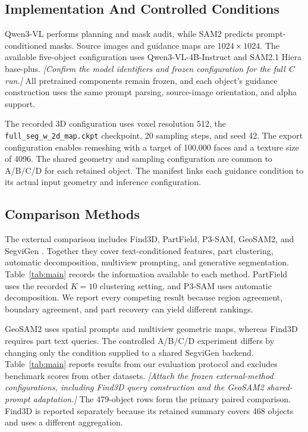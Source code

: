 \documentclass[pdflatex,iicol,sn-apa]{sn-jnl}
\newcommand{\pending}[1]{{\color{DraftText}\textit{[#1]}}}
\begin{document}
\subsection{Implementation And Controlled Conditions}
Qwen3-VL performs planning and mask audit, while SAM2 predicts prompt-conditioned masks. Source images and guidance maps are $1024\times1024$. The available five-object configuration uses Qwen3-VL-4B-Instruct and SAM2.1 Hiera base-plus. \pending{Confirm the model identifiers and frozen configuration for the full C run.} All pretrained components remain frozen, and each object's guidance construction uses the same prompt parsing, source-image orientation, and alpha support.

The recorded 3D configuration uses voxel resolution 512, the \texttt{full\_seg\_w\_2d\_map.ckpt} checkpoint, 20 sampling steps, and seed 42. The export configuration enables remeshing with a target of 100,000 faces and a texture size of 4096. The shared geometry and sampling configuration are common to A/B/C/D for each retained object. The manifest links each guidance condition to its actual input geometry and inference configuration.

\subsection{Comparison Methods}
The external comparison includes Find3D, PartField, P3-SAM, GeoSAM2, and SegviGen \citep{ma2024find3d,liu2025partfield,ma2025p3sam,deng2025geosam2,li2026segvigen}. Together they cover text-conditioned features, part clustering, automatic decomposition, multiview prompting, and generative segmentation. Table~\ref{tab:main} records the information available to each method. PartField uses the recorded $K=10$ clustering setting, and P3-SAM uses automatic decomposition. We report every competing result because region agreement, boundary agreement, and part recovery can yield different rankings.

GeoSAM2 uses spatial prompts and multiview geometric maps, whereas Find3D requires part text queries. The controlled A/B/C/D experiment differs by changing only the condition supplied to a shared SegviGen backend. Table~\ref{tab:main} reports results from our evaluation protocol and excludes benchmark scores from other datasets. \pending{Attach the frozen external-method configurations, including Find3D query construction and the GeoSAM2 shared-prompt adaptation.} The 479-object rows form the primary paired comparison. Find3D is reported separately because its retained summary covers 468 objects and uses a different aggregation.
\end{document}
